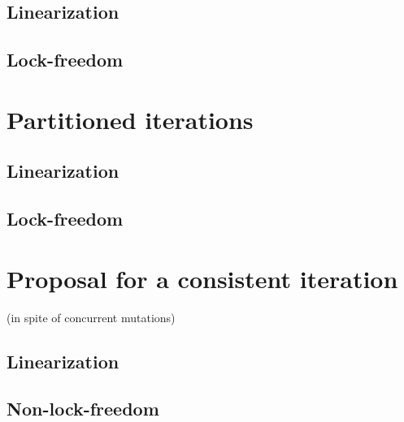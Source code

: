 \subsection{Linearization}
\subsection{Lock-freedom}

\section{Partitioned iterations}
\subsection{Linearization}
\subsection{Lock-freedom}

\section{Proposal for a consistent iteration}

(in spite of concurrent mutations)

\subsection{Linearization}
\subsection{Non-lock-freedom}
